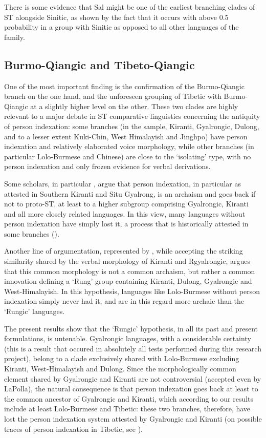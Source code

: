 \documentclass[oneside,a4paper,11pt]{article}
\begin{document}
There is some evidence that Sal might be one of the earliest branching clades of ST alongside Sinitic, as shown by the fact that it occurs with above 0.5 probability in a group with Sinitic as opposed to all other languages of the family. 

\subsection{Burmo-Qiangic and Tibeto-Qiangic}
One of the most important finding is the confirmation of the Burmo-Qiangic branch on the one hand, and the unforeseen grouping of Tibetic with Burmo-Qiangic at a slightly higher level on the other. These two clades are highly relevant to a major debate in ST comparative linguistics concerning the antiquity of person indexation: some branches (in the sample, Kiranti, Gyalrongic, Dulong, and to a lesser extent Kuki-Chin, West Himalayish and Jinghpo) have person indexation and relatively elaborated voice morphology, while other branches (in particular Lolo-Burmese and Chinese) are close to the `isolating' type, with no person indexation and only frozen evidence for verbal derivations.

Some scholars, in particular \citet{driem93agreement, delancey10agreement, jacques12agreement, delancey14second}, argue that person indexation, in particular as attested in Southern Kiranti and Situ Gyalrong, is an archaism and goes back if not to proto-ST, at least to a higher subgroup comprising Gyalrongic, Kiranti and all more closely related languages. In this view, many languages without person indexation have simply lost it, a process that is historically attested in some branches (\citealt{delancey15complexity}).

Another line of argumentation, represented by \citet{lapolla01migration, lapolla13subgrouping}, while accepting the striking similarity shared by the verbal morphology of Kiranti and Rgyalrongic, argues that this common morphology is not a common archaism, but rather a common innovation defining a `Rung' group containing Kiranti, Dulong, Gyalrongic and West-Himalayish. In this hypothesis, languages like Lolo-Burmese without person indexation simply never had it, and are in this regard more archaic than the `Rungic' languages.

The present results show that the `Rungic' hypothesis, in all its past and present formulations, is untenable. Gyalrongic languages, with a considerable certainty (this is a result that occured in absolutely all tests performed during this research project), belong to a clade exclusively shared with Lolo-Burmese excluding Kiranti, West-Himalayish and Dulong. Since the morphologically common element shared by Gyalrongic and Kiranti are not controversial (accepted even by LaPolla), the natural consequence is that person indexation goes back at least to the common ancestor of Gyalrongic and Kiranti, which according to our results include at least Lolo-Burmese and Tibetic: these two branches, therefore, have lost the person indexation system attested by Gyalrongic and Kiranti (on possible traces of person indexation in Tibetic, see \citealt{jacques10zos, driem11TB}).
\end{document}
